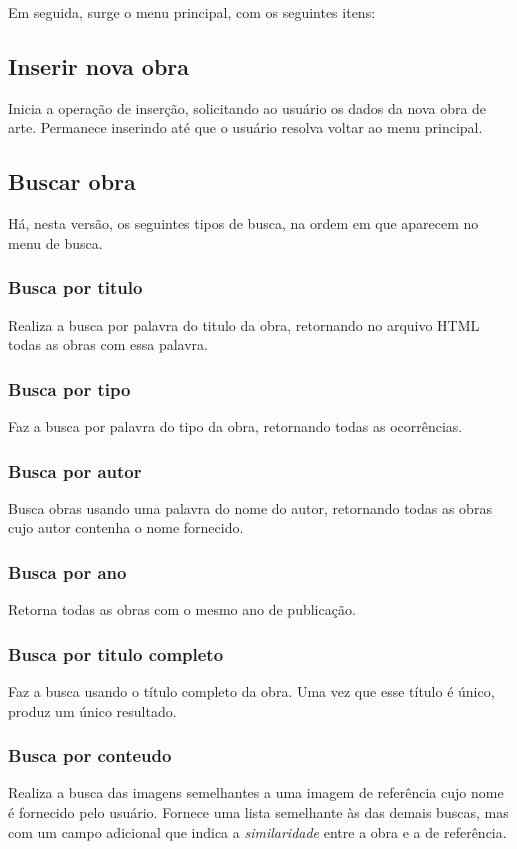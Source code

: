\documentclass[10pt,a4paper,draft]{article}
\begin{document}
Em seguida, surge o menu principal, com os seguintes itens:

\subsection{Inserir nova obra}
Inicia a operação de inserção, solicitando ao usuário os dados da nova obra de arte. Permanece inserindo até que o usuário resolva voltar ao menu principal.

\subsection{Buscar obra}
Há, nesta versão, os seguintes tipos de busca, na ordem em que aparecem no menu de busca.

\subsubsection{Busca por titulo}
Realiza a busca por palavra do titulo da obra, retornando no arquivo HTML todas as obras com essa palavra.

\subsubsection{Busca por tipo}
Faz a busca por palavra do tipo da obra, retornando todas as ocorrências.

\subsubsection{Busca por autor}
Busca obras usando uma palavra do nome do autor, retornando todas as obras cujo autor contenha o nome fornecido.

\subsubsection{Busca por ano}
Retorna todas as obras com o mesmo ano de publicação.

\subsubsection{Busca por titulo completo}
Faz a busca usando o título completo da obra. Uma vez que esse título é único, produz um único resultado.

\subsubsection{Busca por conteudo}
Realiza a busca das imagens semelhantes a uma imagem de referência cujo nome é fornecido pelo usuário. Fornece uma lista semelhante às das demais buscas, mas com um campo adicional que indica a \textit{similaridade} entre a obra e a de referência.
\end{document}
